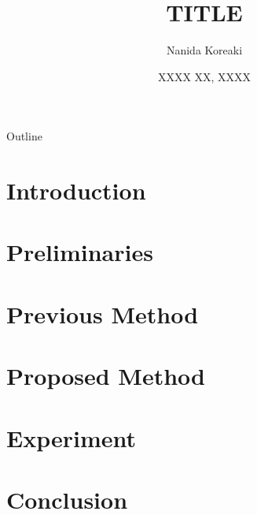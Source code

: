 \documentclass[aspectratio=169, 10.5pt]{beamer}
\title{TITLE}
\institute{XXXX XXXX XXXX}
\author{Nanida Koreaki}
\date{XXXX XX, XXXX}
\begin{document}
\begin{frame}
    \titlepage
\end{frame}

\begin{frame}{Outline}
    \tableofcontents
\end{frame}

\section{Introduction}


\section{Preliminaries}


\section{Previous Method}


\section{Proposed Method}


\section{Experiment}


\section{Conclusion}



\end{document}
